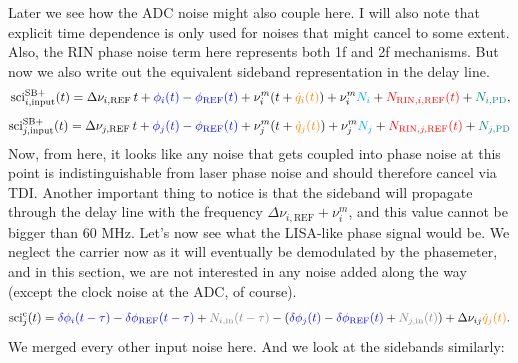 \documentclass[11pt]{article}
\begin{document}
Later we see how the ADC noise might also couple here. I will also note that explicit time dependence is only used for noises that might cancel to some extent. Also, the RIN phase noise term here represents both 1f and 2f mechanisms. But now we also write out the equivalent sideband representation in the delay line.
\begin{align*}
    \text{sci}_{i,\text{input}}^{\text{SB}+}(t) = \Delta\nu_{i,\text{REF}}\, t + {\color{blue}\phi_{i}(t)}-{\color{blue}\phi_{\text{REF}}(t)} + \nu_{i}^m (t+{\color{orange}\dot{q}_i(t)}) +\nu_{i}^m {\color{cyan}N_{i}}+  {\color{red}N_{\text{RIN}, i,\text{REF}}(t)}+ {\color{teal}N_{i,\text{PD}}},\\[5pt]
    \text{sci}_{j,\text{input}}^{\text{SB}+}(t) = \Delta\nu_{j,\text{REF}}\, t + {\color{blue}\phi_{j}(t)}-{\color{blue}\phi_{\text{REF}}(t)} + \nu_{j}^m (t+{\color{orange}\dot{q}_j(t)}) +  \nu_{j}^m{\color{cyan}N_{j}}+  {\color{red}N_{\text{RIN}, j,\text{REF}}(t)}+ {\color{teal}N_{j,\text{PD}}}
\end{align*}
Now, from here, it looks like any noise that gets coupled into phase noise at this point is indistinguishable from laser phase noise and should therefore cancel via TDI. Another important thing to notice is that the sideband will propagate through the delay line with the frequency $\Delta\nu_{i,\text{REF}}+ \nu_{i}^m$, and this value cannot be bigger than 60 MHz. Let's now see what the LISA-like phase signal would be. We neglect the carrier now as it will eventually be demodulated by the phasemeter, and in this section, we are not interested in any noise added along the way (except the clock noise at the ADC, of course).
\begin{align*}
    \text{sci}_j^\text{c}(t) = {\color{blue}\delta \phi_{i}(t-\tau)}-{\color{blue}\delta \phi_{\text{REF}}(t-\tau)} + {\color{gray}N_{i,\text{in}}(t-\tau)} - \left({\color{blue}\delta \phi_{j}(t)}-{\color{blue}\delta \phi_{\text{REF}}(t)} + {\color{gray}N_{j,\text{in}}(t)}\right) + \Delta\nu_{ij}{\color{orange}\dot{q}_j(t)}.
\end{align*}
We merged every other input noise here. And we look at the sidebands similarly:
\end{document}
